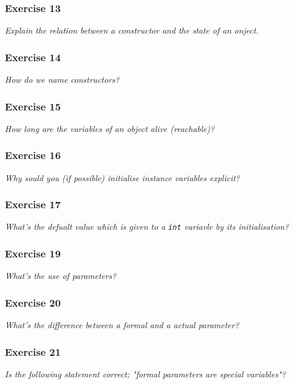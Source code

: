 \subsubsection*{Exercise 13}
\textit{Explain the relation between a constructor and the state of an 
	onject.}\\

\subsubsection*{Exercise 14}
\textit{How do we name constructors?}\\

\subsubsection*{Exercise 15}
\textit{How long are the variables of an object alive (reachable)?}\\

\subsubsection*{Exercise 16}
\textit{Why sould you (if possible) initialise instance variables explicit?}\\

\subsubsection*{Exercise 17}
\textit{What's the defualt value which is given to a \lstinline{int} variavle
	by its initialisation?}\\

\subsubsection*{Exercise 19}
\textit{What's the use of parameters?}\\

\subsubsection*{Exercise 20}
\textit{What's the difference between a formal and a actual parameter?}\\

\subsubsection*{Exercise 21}
\textit{Is the following statement correct; "formal parameters are special
	variables"?}\\

